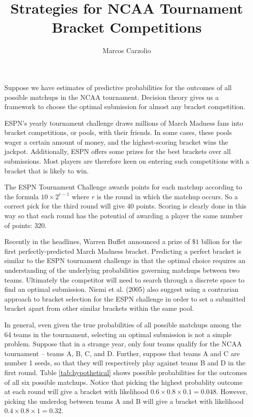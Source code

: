 \documentclass[11pt]{article} %
\title{Strategies for NCAA Tournament Bracket Competitions}
\author{Marcos Carzolio}
\date{} %
\begin{document}
\maketitle

Suppose we have estimates of predictive probabilities for the outcomes of all possible matchups in the NCAA tournament. Decision theory gives us a framework to choose the optimal submission for almost any bracket competition. 

ESPN's yearly tournament challenge draws millions of March Madness fans into bracket competitions, or pools, with their friends. In some cases, these pools wager a certain amount of money, and the highest-scoring bracket wins the jackpot. Additionally, ESPN offers some prizes for the best brackets over all submissions. Most players are therefore keen on entering such competitions with a bracket that is likely to win. 

The ESPN Tournament Challenge awards points for each matchup according to the formula $10\times2^{r-1}$ where $r$ is the round in which the matchup occurs. So a correct pick for the third round will give $40$ points. Scoring is clearly done in this way so that each round has the potential of awarding a player the same number of points: 320. 

Recently in the headlines, Warren Buffet announced a prize of $\$1$ billion for the first perfectly-predicted March Madness bracket. Predicting a perfect bracket is similar to the ESPN tournament challenge in that the optimal choice requires an understanding of the underlying probabilities governing matchups between two teams. Ultimately the competitor will need to search through a discrete space to find an optimal submission. Niemi et al. (2005) also suggest using a contrarian approach to bracket selection for the ESPN challenge in order to set a submitted bracket apart from other similar brackets within the same pool. 

In general, even given the true probabilities of all possible matchups among the 64 teams in the tournament, selecting an optimal submission is not a simple problem. Suppose that in a strange year, only four teams qualify for the NCAA tournament -- teams A, B, C, and D. Further, suppose that teams A and C are number 1 seeds, so that they will respectively play against teams B and D in the first round. Table \ref{tab:hypothetical} shows possible probabilities for the outcomes of all six possible matchups. Notice that picking the highest probablity outcome at each round will give a bracket with likelihood $0.6\times0.8\times0.1=0.048$. However, picking the underdog between teams A and B will give a bracket with likelihood $0.4\times0.8\times1=0.32$. 
\end{document}
